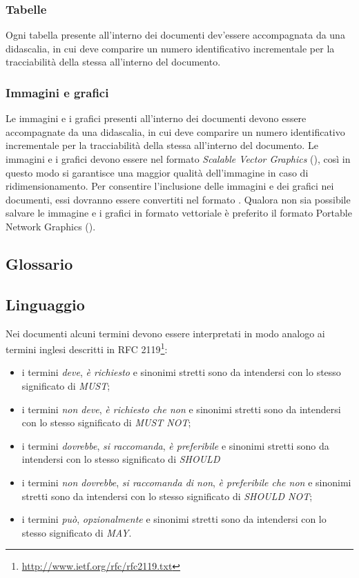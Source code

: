 \documentclass[12pt,a4paper]{article}
\begin{document}
\subsubsection{Tabelle}
Ogni tabella presente all'interno dei documenti dev'essere accompagnata da una didascalia, in cui deve comparire un numero identificativo incrementale per la tracciabilità della stessa all'interno del documento.

\subsubsection{Immagini e grafici}
Le immagini e i grafici presenti all'interno dei documenti devono essere accompagnate da una didascalia, in cui deve comparire un numero identificativo incrementale per la tracciabilità della stessa all'interno del documento. Le immagini e i grafici devono essere nel formato \emph{Scalable Vector Graphics} (), così in questo modo si garantisce una maggior qualità dell'immagine in caso di ridimensionamento. Per consentire l'inclusione delle immagini e dei grafici nei documenti, essi dovranno essere convertiti nel formato  . Qualora non sia possibile salvare le immagine e i grafici in formato vettoriale è preferito il formato Portable Network Graphics ().

\subsection{Glossario}
\TODO{}

\subsection{Linguaggio}
Nei documenti alcuni termini devono essere interpretati in modo analogo ai termini inglesi descritti in RFC 2119\footnote{\url{http://www.ietf.org/rfc/rfc2119.txt}}:
\begin{itemize}
	\item i termini \emph{deve}, \emph{è richiesto} e sinonimi stretti sono da intendersi con lo stesso significato di \emph{MUST};
	\item i termini \emph{non deve}, \emph{è richiesto che non} e sinonimi stretti sono da intendersi con lo stesso significato di \emph{MUST NOT};
	\item i  termini \emph{dovrebbe}, \emph{si raccomanda}, \emph{è preferibile} e sinonimi stretti sono da intendersi con lo stesso significato di \emph{SHOULD}
	\item i termini \emph{non dovrebbe}, \emph{si raccomanda di non}, \emph{è preferibile che non} e sinonimi stretti sono da intendersi con lo stesso significato di \emph{SHOULD NOT};
	\item i termini \emph{può}, \emph{opzionalmente} e sinonimi stretti sono da intendersi con lo stesso significato di \emph{MAY}.
\end{itemize}
\end{document}
